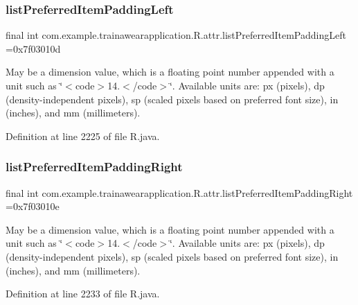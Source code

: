 \subsubsection{\texorpdfstring{listPreferredItemPaddingLeft}{listPreferredItemPaddingLeft}}
{\footnotesize\ttfamily final int com.\+example.\+trainawearapplication.\+R.\+attr.\+list\+Preferred\+Item\+Padding\+Left =0x7f03010d\hspace{0.3cm}{\ttfamily [static]}}

May be a dimension value, which is a floating point number appended with a unit such as \char`\"{}$<$code$>$14.\+5sp$<$/code$>$\char`\"{}. Available units are\+: px (pixels), dp (density-\/independent pixels), sp (scaled pixels based on preferred font size), in (inches), and mm (millimeters). 

Definition at line 2225 of file R.\+java.

\mbox{\label{classcom_1_1example_1_1trainawearapplication_1_1_r_1_1attr_a3bfddaccd571f6c1ee19df0ccf47c68b}} 
\subsubsection{\texorpdfstring{listPreferredItemPaddingRight}{listPreferredItemPaddingRight}}
{\footnotesize\ttfamily final int com.\+example.\+trainawearapplication.\+R.\+attr.\+list\+Preferred\+Item\+Padding\+Right =0x7f03010e\hspace{0.3cm}{\ttfamily [static]}}

May be a dimension value, which is a floating point number appended with a unit such as \char`\"{}$<$code$>$14.\+5sp$<$/code$>$\char`\"{}. Available units are\+: px (pixels), dp (density-\/independent pixels), sp (scaled pixels based on preferred font size), in (inches), and mm (millimeters). 

Definition at line 2233 of file R.\+java.

\mbox{\label{classcom_1_1example_1_1trainawearapplication_1_1_r_1_1attr_a9f9dca4b8651ad25f8ee810f810b7188}} 
